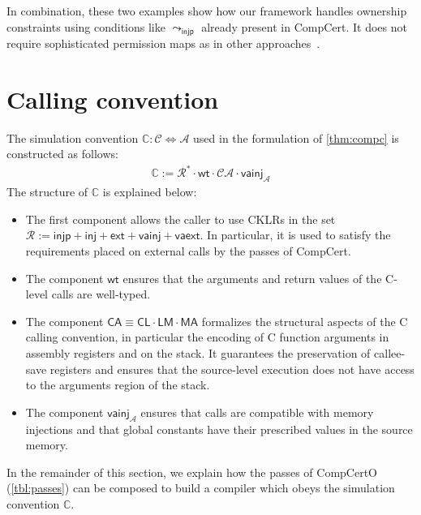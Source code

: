 \documentclass[sigplan,screen,review]{acmart}
\newcommand{\kw}[1]{\ensuremath{ \mathsf{#1} }}
\newcommand{\cc}[2]{{ \kw{#1#2} }}
\begin{document}
In combination, these two examples show how our framework handles
ownership constraints using conditions like $\leadsto_\kw{injp}$
already present in CompCert. It does not require sophisticated
permission maps as in other approaches~\cite{compcompcert,compcertm}.



\section{Calling convention} \label{sec:callconv} %


The simulation convention
$\mathbb{C} : \mathcal{C} \Leftrightarrow \mathcal{A}$
used in the formulation of \autoref{thm:compc}
is constructed as follows:
\[
  \begin{array}{c}
  \mathbb{C} :=
    \mathcal{R}^* \cdot
    \kw{wt} \cdot
    \mathcal{C}\!\mathcal{A} \cdot
    \kw{vainj}_{\!\mathcal{A}}
  \end{array}
\]
The structure of $\mathbb{C}$
is explained below:
\begin{itemize}
\item
The first component
allows the caller to 
use CKLRs in the set
$
  \mathcal{R} := \kw{injp} + \kw{inj} + \kw{ext} + \kw{vainj} + \kw{vaext}
$.
In particular,
it is used to satisfy the requirements
placed on external calls by the passes of CompCert.
\item
The component \kw{wt}
ensures that the arguments and return values of the C-level calls are well-typed.
\item
The component
$\cc{C}{A} \equiv \cc{C}{L} \cdot \cc{L}{M} \cdot \cc{M}{A}$
formalizes the structural aspects of
the C calling convention,
in particular
the encoding of C function arguments
in assembly registers and on the stack.
It guarantees the preservation of
callee-save registers
and ensures that the source-level execution
does not have access to the arguments region
of the stack.
\item
The component
$\kw{vainj}_{\!\mathcal{A}}$
ensures that calls are compatible with memory injections
and that global constants have their prescribed values
in the source memory.
\end{itemize}

In the remainder of this section,
we explain how the passes of CompCertO
(\autoref{tbl:passes})
can be composed to build a compiler
which obeys the simulation convention $\mathbb{C}$.
\end{document}
